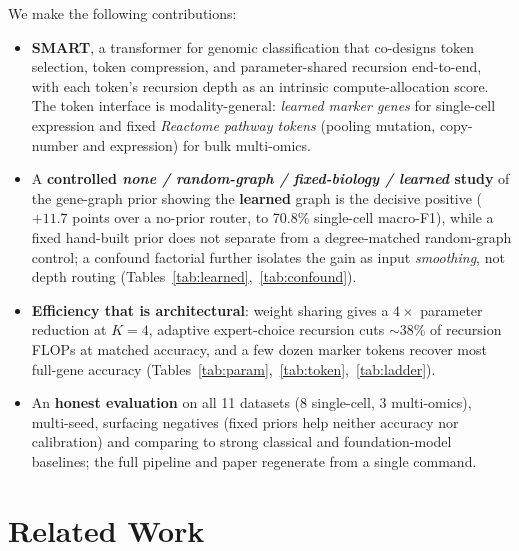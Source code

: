 \documentclass[letterpaper]{article}
\begin{document}
We make the following contributions:
\begin{itemize}
\item \textbf{SMART}, a transformer for genomic classification that co-designs token
selection, token compression, and parameter-shared recursion end-to-end, with each token's
recursion depth as an intrinsic compute-allocation score. The token interface is
modality-general: \emph{learned marker genes} for single-cell expression and fixed
\emph{Reactome pathway tokens} (pooling mutation, copy-number and expression) for bulk
multi-omics.
\item A \textbf{controlled \emph{none / random-graph / fixed-biology / learned} study} of
the gene-graph prior showing the \textbf{learned} graph is the decisive positive
($+11.7$ points over a no-prior router, to 70.8\% single-cell
macro-F1), while a fixed hand-built prior does not separate from a degree-matched
random-graph control; a confound factorial further isolates the gain as input
\emph{smoothing}, not depth routing (Tables~\ref{tab:learned},~\ref{tab:confound}).
\item \textbf{Efficiency that is architectural}: weight sharing gives a
$4\times$ parameter reduction at $K{=}4$, adaptive expert-choice
recursion cuts $\sim$38\% of recursion FLOPs at matched accuracy, and a few
dozen marker tokens recover most full-gene accuracy (Tables~\ref{tab:param},~\ref{tab:token},~\ref{tab:ladder}).
\item An \textbf{honest evaluation} on all 11 datasets ($8$ single-cell,
$3$ multi-omics), multi-seed, surfacing negatives (fixed priors help neither
accuracy nor calibration) and comparing to strong classical and foundation-model baselines;
the full pipeline and paper regenerate from a single command.
\end{itemize}

\section{Related Work}
\end{document}
